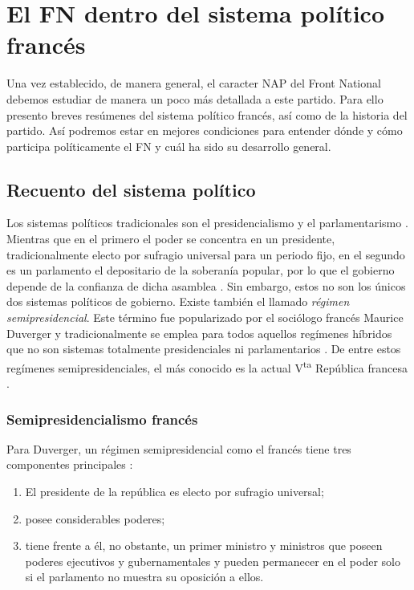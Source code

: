 \chapter{El FN dentro del sistema político francés}

Una vez establecido, de manera general, el caracter NAP del Front National debemos estudiar de manera un poco más detallada a este partido. Para ello presento breves resúmenes del sistema político francés, así como de la historia del partido. Así podremos estar en mejores condiciones para entender dónde y cómo participa políticamente el FN y cuál ha sido su desarrollo general. 

\section{Recuento del sistema político}

Los sistemas políticos tradicionales son el presidencialismo y el parlamentarismo \parencites[12]{Carpizo78}[39]{Veser99}. Mientras que en el primero el poder se concentra en un presidente, tradicionalmente electo por sufragio universal para un periodo fijo, en el segundo es un parlamento el depositario de la soberanía popular, por lo que el gobierno depende de la confianza de dicha asamblea \parencite[52]{Linz90}. Sin embargo, estos no son los únicos dos sistemas políticos de gobierno. Existe también el llamado \textit{régimen semipresidencial}. Este término fue popularizado por el sociólogo francés Maurice Duverger y tradicionalmente se emplea para todos aquellos regímenes híbridos que no son sistemas totalmente  presidenciales ni parlamentarios \parencites{Veser99}[7]{Carpizo04}[52]{Linz90}. De entre estos regímenes semipresidenciales, el más conocido es la actual V\textsuperscript{ta} República francesa \parencite[7]{Carpizo04}.\\

\subsection{Semipresidencialismo francés}

Para Duverger, un régimen semipresidencial como el francés tiene tres componentes principales \parencite[42]{Veser99}:

\begin{enumerate}
\item El presidente de la república es electo por sufragio universal;
\item posee considerables poderes;
\item tiene frente a él, no obstante, un primer ministro y ministros que poseen poderes ejecutivos y gubernamentales y pueden permanecer en el poder solo si el parlamento no muestra su oposición a ellos.
\end{enumerate}

